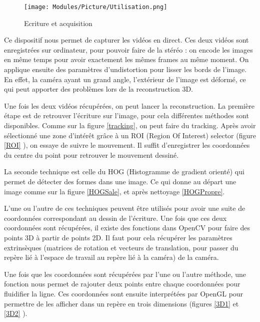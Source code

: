 
\begin{figure}[!h]
\centering
\texttt{[image: Modules/Picture/Utilisation.png]}
\caption{Ecriture et acquisition}
\label{utilisation}
\end{figure}

Ce dispositif nous permet de capturer les vidéos en direct. Ces deux vidéos sont enregistrées sur ordinateur, pour pouvoir faire de la stéréo : on encode les images en même temps pour avoir exactement les mêmes frames au même moment. On applique ensuite des paramètres d'undistortion pour lisser les bords de l'image. En effet, la caméra ayant un grand angle, l'extérieur de l'image est déformé, ce qui peut apporter des problèmes lors de la reconstruction 3D.

Une fois les deux vidéos récupérées, on peut lancer la reconstruction. La première étape est de retrouver l'écriture sur l'image, pour cela différentes méthodes sont disponibles. Comme sur la figure \ref{tracking}, on peut faire du tracking. Après avoir sélectionné une zone d'intérêt grâce à un ROI (Region Of Interest) selector (figure \ref{ROI} ), on essaye de suivre le mouvement. Il suffit d'enregistrer les coordonnées du centre du point pour retrouver le mouvement dessiné.

La seconde technique est celle du HOG (Histogramme de gradient orienté) qui permet de détecter des formes dans une image. Ce qui donne au départ une image comme sur la figure \ref{HOGSale}, et après nettoyage \ref{HOGPropre}.

L'une ou l'autre de ces techniques peuvent être utilisés pour avoir une suite de coordonnées correspondant au dessin de l'écriture. Une fois que ces deux coordonnées sont récupérées, il existe des fonctions dans OpenCV pour faire des points 3D à partir de points 2D. Il faut pour cela récupérer les paramètres extrinsèques (matrices de rotation et vecteurs de translation, pour passer du repère lié à l'espace de travail au repère lié à la caméra) de la caméra.

Une fois que les coordonnées sont récupérées par l'une ou l'autre méthode, une fonction nous permet de rajouter deux points entre chaque coordonnées pour fluidifier la ligne. Ces coordonnées sont ensuite interprétées par OpenGL pour permettre de les afficher dans un repère en trois dimensions (figures \ref{3D1} et \ref{3D2} ).


